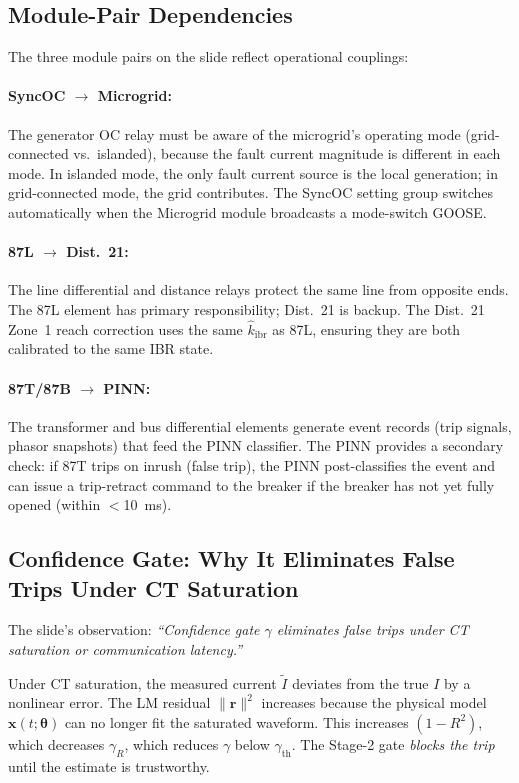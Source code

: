\documentclass[12pt,a4paper]{article}
\newcommand{\kibrhat}{\hat{k}_\mathrm{ibr}}
\newcommand{\gammath}{\gamma_\mathrm{th}}
\newcommand{\rvec}{\mathbf{r}}
\begin{document}
\subsection{Module-Pair Dependencies}

The three module pairs on the slide reflect operational couplings:

\paragraph{SyncOC $\to$ Microgrid:}
The generator OC relay must be aware of the microgrid's operating mode
(grid-connected vs.\ islanded), because the fault current magnitude
is different in each mode.  In islanded mode, the only fault current
source is the local generation; in grid-connected mode, the grid
contributes.  The SyncOC setting group switches automatically when
the Microgrid module broadcasts a mode-switch GOOSE.

\paragraph{87L $\to$ Dist.~21:}
The line differential and distance relays protect the same line from opposite
ends.  The 87L element has primary responsibility; Dist.~21 is backup.
The Dist.~21 Zone~1 reach correction uses the same $\kibrhat$ as 87L,
ensuring they are both calibrated to the same IBR state.

\paragraph{87T/87B $\to$ PINN:}
The transformer and bus differential elements generate event records (trip
signals, phasor snapshots) that feed the PINN classifier.  The PINN provides
a secondary check: if 87T trips on inrush (false trip), the PINN
post-classifies the event and can issue a trip-retract command to the breaker
if the breaker has not yet fully opened (within $<$10~ms).

\subsection{Confidence Gate: Why It Eliminates False Trips Under CT Saturation}

The slide's observation: \emph{``Confidence gate $\gamma$ eliminates false trips
under CT saturation or communication latency.''}

Under CT saturation, the measured current $\tilde{I}$ deviates from the
true $I$ by a nonlinear error.  The LM residual $\|\rvec\|^2$ increases
because the physical model $\mathbf{x}(t;\bm{\theta})$ can no longer
fit the saturated waveform.  This increases $(1-R^2)$, which decreases
$\gamma_R$, which reduces $\gamma$ below $\gammath$.  The Stage-2 gate
\emph{blocks the trip} until the estimate is trustworthy.
\end{document}
